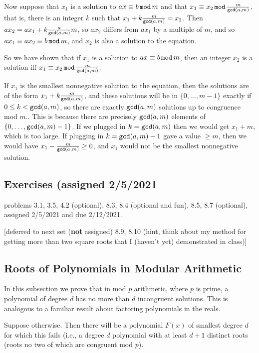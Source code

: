 \documentclass[12pt]{article}
\begin{document}
Now suppose that $x_1$ is a solution to $ax \equiv b\,{\tt mod}\,m$ and that $x_1\equiv x_2\, {\tt mod}\, \frac m{{\tt gcd}(a,m)}$, that is, there is an integer $k$ such that $x_1+k\frac m{{\tt gcd}(a,m)} = x_2$.  Then $ax_2 = ax_1+k\frac a{{\tt gcd}(a,m)}m$, so $ax_2$ differs from $ax_1$ by a multiple of $m$, and so $ax_1 \equiv ax_2 \equiv b \, {\tt mod}\, m$, and $x_2$ is also a solution to the equation.

So we have shown that if $x_1$ is a solution to $ax \equiv b\,{\tt mod}\,m$, then an integer $x_2$ is a solution iff $x_1\equiv x_2\, {\tt mod}\, \frac m{{\tt gcd}(a,m)}.$

If $x_1$ is the smallest nonnegative solution to the equation, then the solutions are of the form $x_1+k\frac m{{\tt gcd}(a,m)}$, and these solutions will be in $\{0,\ldots,m-1\}$ exactly if $0 \leq k < {\tt gcd}(a,m)$, so there are exactly ${\tt gcd}(a,m)$ solutions up to congruence mod $m$..  This is because there are precisely ${\tt gcd}(a,m)$ elements of $\{0,\ldots,{\tt gcd}(a,m)-1\}$.  If we plugged in $k={\tt gcd}(a,m)$ then we would get $x_1+m$, which is too large.  If plugging in $k={\tt gcd}(a,m)-1$ gave a value $\geq m$, then we would have $x_1-\frac m{{\tt gcd}(a,m)}\geq 0$, and $x_1$ would not be the smallest nonnegative solution.

\subsection{Exercises (assigned 2/5/2021}

problems 3.1, 3.5, 4.2 (optional), 8.3, 8.4 (optional and fun), 8.5, 8.7 (optional), assigned 2/5/2021 and due 2/12/2021.

[deferred to next set ({\bf not} assigned) 8.9, 8.10 (hint, think about my method for getting more than two square roots that I (haven't yet) demonstrated in class)]


\subsection{Roots of Polynomials in Modular Arithmetic}

In this subsection we prove that in mod $p$ arithmetic, where $p$ is prime, a polynomial of degree $d$ has
no more than $d$ incongruent solutions.   This is analogous to a familiar result about factoring polynomials in the reals.

Suppose otherwise.  Then there will be a polynomial $F(x)$ of smallest degree $d$ for which this fails (i.e., a degree $d$ polynomial with at least $d+1$ distinct roots (roots no two of which are congruent mod $p$).
\end{document}

